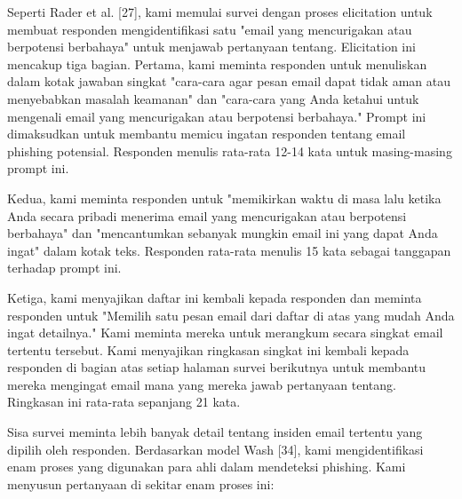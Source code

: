\documentclass[lettersize,journal]{IEEEtran}
\begin{document}
Seperti Rader et al. [27], kami memulai survei dengan proses elicitation untuk
membuat responden mengidentifikasi satu "email yang mencurigakan atau
berpotensi berbahaya" untuk menjawab pertanyaan tentang. Elicitation ini
mencakup tiga bagian. Pertama, kami meminta responden untuk menuliskan dalam
kotak jawaban singkat "cara-cara agar pesan email dapat tidak aman atau
menyebabkan masalah keamanan" dan "cara-cara yang Anda ketahui untuk mengenali
email yang mencurigakan atau berpotensi berbahaya." Prompt ini dimaksudkan
untuk membantu memicu ingatan responden tentang email phishing potensial.
Responden menulis rata-rata 12-14 kata untuk masing-masing prompt ini.

Kedua, kami meminta responden untuk "memikirkan waktu di masa lalu ketika Anda
secara pribadi menerima email yang mencurigakan atau berpotensi berbahaya" dan
"mencantumkan sebanyak mungkin email ini yang dapat Anda ingat" dalam kotak
teks. Responden rata-rata menulis 15 kata sebagai tanggapan terhadap prompt
ini.

Ketiga, kami menyajikan daftar ini kembali kepada responden dan meminta
responden untuk "Memilih satu pesan email dari daftar di atas yang mudah Anda
ingat detailnya." Kami meminta mereka untuk merangkum secara singkat email
tertentu tersebut. Kami menyajikan ringkasan singkat ini kembali kepada
responden di bagian atas setiap halaman survei berikutnya untuk membantu mereka
mengingat email mana yang mereka jawab pertanyaan tentang. Ringkasan ini
rata-rata sepanjang 21 kata.

Sisa survei meminta lebih banyak detail tentang insiden email tertentu yang
dipilih oleh responden. Berdasarkan model Wash [34], kami mengidentifikasi enam
proses yang digunakan para ahli dalam mendeteksi phishing. Kami menyusun
pertanyaan di sekitar enam proses ini:
\end{document}
